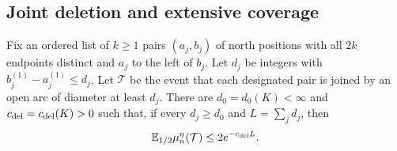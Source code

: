 \subsection{Joint deletion and extensive coverage}
\begin{lemma}\label{lem:jointprice}
Fix an ordered list of $k\ge1$ pairs $(a_j,b_j)$ of north positions with all $2k$ endpoints distinct and $a_j$ to the left of $b_j$. Let $d_j$ be integers with $b_j^{(1)}-a_j^{(1)}\le d_j$. Let $\mathcal T$ be the event that each designated pair is joined by an open arc of diameter at least $d_j$. There are $d_0=d_0(K)<\infty$ and $c_{\rm del}=c_{\rm del}(K)>0$ such that, if every $d_j\ge d_0$ and $L=\sum_jd_j$, then
\begin{equation}\label{eq:jointprice}
 \mathbb E_{1/2}\mu_n^\eta(\mathcal T)\le2e^{-c_{\rm del}L}.
\end{equation}
\end{lemma}
